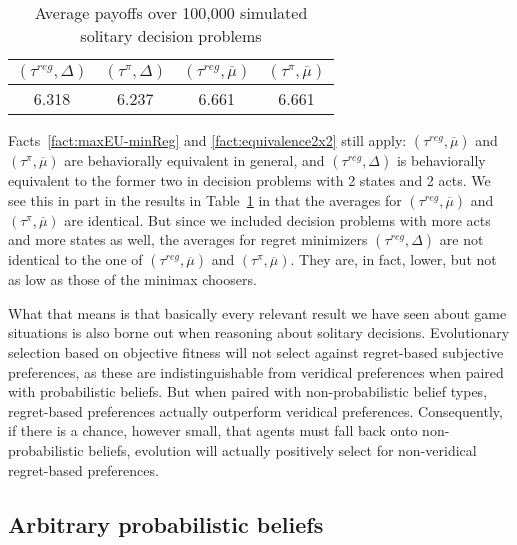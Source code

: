 \documentclass[fleqn,reqno,11pt]{article}
\begin{document}
\begin{table}
  \centering
  \begin{tabular}{cccc}
    \toprule
   $(\tau^{reg}, \Delta)$ 
 & $(\tau^{\pi}, \Delta)$ 
 & $(\tau^{reg}, \overline{\mu})$ 
 & $(\tau^{\pi}, \overline{\mu})$ 
 \\ \midrule
    6.318 & 6.237 & 6.661 & 6.661 \\ \bottomrule
  \end{tabular}
  \caption{Average payoffs over 100,000 simulated solitary decision problems}
  \label{tab:SolitaryDecisions}
\end{table}

Facts~\ref{fact:maxEU-minReg} and \ref{fact:equivalence2x2} still apply:
$(\tau^{reg}, \overline{\mu})$ and $(\tau^{\pi}, \overline{\mu})$ are behaviorally equivalent
in general, and $(\tau^{reg}, \Delta)$ is behaviorally equivalent to the former two in
decision problems with 2 states and 2 acts.  We see this in part in the
results in Table~\ref{tab:SolitaryDecisions} in that the averages for $(\tau^{reg},
  \overline{\mu})$ and $(\tau^{\pi}, \overline{\mu})$ are identical. But since we included decision
problems with more acts and more states as well, the averages for regret minimizers
$(\tau^{reg}, \Delta)$ are not identical to the one of $(\tau^{reg},
  \overline{\mu})$ and $(\tau^{\pi}, \overline{\mu})$. They are, in fact, lower, but not as low as
those of the minimax choosers. 

What that means is that basically every relevant result we have seen about game situations is also borne out
when reasoning about solitary decisions. Evolutionary selection based on objective fitness will
not select against regret-based subjective preferences, as these are indistinguishable from
veridical preferences when paired with probabilistic beliefs. But when paired with
non-probabilistic belief types, regret-based preferences actually outperform veridical
preferences. Consequently, if there is a chance, however small, that agents must fall back onto
non-probabilistic beliefs, evolution will actually positively select for non-veridical
regret-based preferences.


\iffalse
\subsection{Arbitrary probabilistic beliefs}
\label{sec:arbitr-prob-beli}
\end{document}
